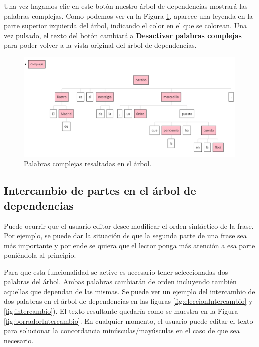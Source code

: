 Una vez hagamos clic en este botón nuestro árbol de dependencias mostrará las palabras complejas. Como podemos ver en la Figura \ref{fig:palabrasComplejas}, aparece una leyenda en la parte superior izquierda del árbol, indicando el color en el que se colorean. Una vez pulsado, el texto del botón cambiará a \textbf{Desactivar palabras complejas} para poder volver a la vista original del árbol de dependencias. 
	 \begin{figure}[h!]
	\centering
	
	
	\includegraphics[scale=0.6]{Imagenes/Figuras/palabrasComplejas}
	
	
	\caption{Palabras complejas resaltadas en el árbol.}
	\label{fig:palabrasComplejas}
\end{figure}
\subsection{Intercambio de partes en el árbol de dependencias}
Puede ocurrir que el usuario editor desee modificar el orden sintáctico de la frase. Por ejemplo, se puede dar la situación de que la segunda parte de una frase sea más importante y por ende se quiera que el lector ponga más atención a esa parte poniéndola al principio. 

Para que esta funcionalidad se active es necesario tener seleccionadas dos palabras del árbol. Ambas palabras cambiarán de orden incluyendo también aquellas que dependan de las mismas. Se puede ver un ejemplo del intercambio de dos palabras en el árbol de dependencias en las figuras \ref{fig:eleccionIntercambio} y \ref{fig:intercambio}). El texto resultante quedaría como se muestra en la Figura \ref{fig:borradorIntercambio}. En cualquier momento, el usuario puede editar el texto para solucionar la concordancia minúsculas/mayúsculas en el caso de que sea necesario.


